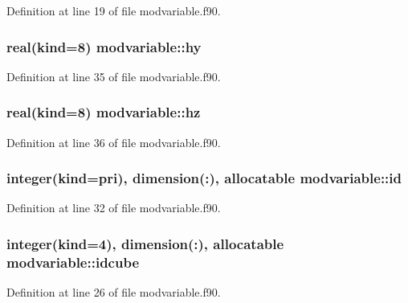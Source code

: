 Definition at line 19 of file modvariable.\+f90.

\subsubsection[{\texorpdfstring{hy}{hy}}]{\setlength{\rightskip}{0pt plus 5cm}real(kind=8) modvariable\+::hy}\hypertarget{namespacemodvariable_a56edfdc4b391ae52b9bcce691c5119d5}{}\label{namespacemodvariable_a56edfdc4b391ae52b9bcce691c5119d5}


Definition at line 35 of file modvariable.\+f90.

\subsubsection[{\texorpdfstring{hz}{hz}}]{\setlength{\rightskip}{0pt plus 5cm}real(kind=8) modvariable\+::hz}\hypertarget{namespacemodvariable_a40a10b2561275758f13b237235540ea9}{}\label{namespacemodvariable_a40a10b2561275758f13b237235540ea9}


Definition at line 36 of file modvariable.\+f90.

\subsubsection[{\texorpdfstring{id}{id}}]{\setlength{\rightskip}{0pt plus 5cm}integer(kind={\bf pri}), dimension(\+:), allocatable modvariable\+::id}\hypertarget{namespacemodvariable_a2ab9f2b8f1081802eb503297c0a7372e}{}\label{namespacemodvariable_a2ab9f2b8f1081802eb503297c0a7372e}


Definition at line 32 of file modvariable.\+f90.

\subsubsection[{\texorpdfstring{idcube}{idcube}}]{\setlength{\rightskip}{0pt plus 5cm}integer(kind=4), dimension(\+:), allocatable modvariable\+::idcube}\hypertarget{namespacemodvariable_a3d2c992bfc80529f8019708135b526c1}{}\label{namespacemodvariable_a3d2c992bfc80529f8019708135b526c1}


Definition at line 26 of file modvariable.\+f90.

